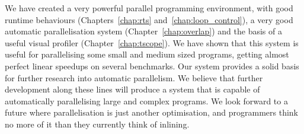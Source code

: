 We have created a very powerful parallel programming environment,
with good runtime behaviours (Chapters~\ref{chap:rts}
and~\ref{chap:loop_control}),
a very good automatic parallelisation system (Chapter~\ref{chap:overlap})
and the basis of a useful visual profiler (Chapter~\ref{chap:tscope}).
We have shown that this system is useful for parallelising some small and
medium sized programs, getting almost perfect linear speedups
on several benchmarks.
Our system provides a solid basis for further research into automatic
parallelism.
We believe that further development along these lines will produce a system
that is capable of automatically parallelising large and complex programs.
We look forward to a future where parallelisation is just another
optimisation, and programmers think no more of it than they currently
think of inlining.


